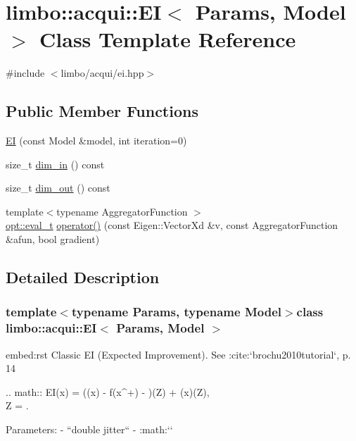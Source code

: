 \hypertarget{classlimbo_1_1acqui_1_1_e_i}{}\section{limbo\+:\+:acqui\+:\+:E\+I$<$ Params, Model $>$ Class Template Reference}
\label{classlimbo_1_1acqui_1_1_e_i}


{\ttfamily \#include $<$limbo/acqui/ei.\+hpp$>$}

\subsection*{Public Member Functions}
\begin{DoxyCompactItemize}
\item 
\hyperlink{classlimbo_1_1acqui_1_1_e_i_aa1e8c3ae70c75d10adf188e0c260a03a}{E\+I} (const Model \&model, int iteration=0)
\item 
size\+\_\+t \hyperlink{classlimbo_1_1acqui_1_1_e_i_a52d965602aa60609e3f4f447dbea285b}{dim\+\_\+in} () const 
\item 
size\+\_\+t \hyperlink{classlimbo_1_1acqui_1_1_e_i_a7b030343c6dae9af80853cfab0868e8d}{dim\+\_\+out} () const 
\item 
{\footnotesize template$<$typename Aggregator\+Function $>$ }\\\hyperlink{group__opt__tools_ga7fc87080ebf563d050fc547d25528ef0}{opt\+::eval\+\_\+t} \hyperlink{classlimbo_1_1acqui_1_1_e_i_a02e0c42197cd45d6b6bb1dc9c91af06d}{operator()} (const Eigen\+::\+Vector\+Xd \&v, const Aggregator\+Function \&afun, bool gradient)
\end{DoxyCompactItemize}


\subsection{Detailed Description}
\subsubsection*{template$<$typename Params, typename Model$>$class limbo\+::acqui\+::\+E\+I$<$ Params, Model $>$}

\begin{DoxyVerb}embed:rst
Classic EI (Expected Improvement). See :cite:`brochu2010tutorial`, p. 14

  .. math::
    EI(x) = (\mu(x) - f(x^+) - \xi)\Phi(Z) + \sigma(x)\phi(Z),\\ Z = .

Parameters:
  - ``double jitter`` - :math:`\xi`
\end{DoxyVerb}
 


